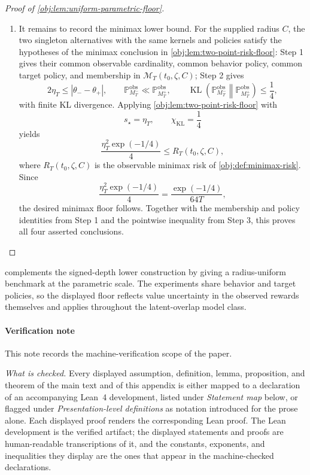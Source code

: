\documentclass[11pt]{article}
\begin{document}
\begin{proof}[Proof of \cref{obj:lem:uniform-parametric-floor}]
\begin{enumerate}
\item It remains to record the minimax lower bound.  For the supplied radius \(C\),
the two singleton alternatives with the same kernels and policies satisfy the
hypotheses of the minimax conclusion in \cref{obj:lem:two-point-risk-floor}:
Step 1 gives their common observable cardinality, common behavior policy,
common target policy, and membership in \(\mathcal M_T(t_0,\zeta,C)\); Step 2
gives
\[
2\eta_T
\le
|\theta_- - \theta_+|,
\qquad
\mathbb P_{M_T^-}^{\mathrm{obs}}\ll
\mathbb P_{M_T^+}^{\mathrm{obs}},
\qquad
\operatorname{KL}\!\left(
\mathbb P_{M_T^-}^{\mathrm{obs}}
\middle\|
\mathbb P_{M_T^+}^{\mathrm{obs}}
\right)
\le
\frac14,
\]
with finite KL divergence.  Applying \cref{obj:lem:two-point-risk-floor} with
\[
s_\star=\eta_T,
\qquad
\chi_{\mathrm{KL}}=\frac14
\]
yields
\[
\frac{\eta_T^2\exp(-1/4)}{4}
\le
R_T(t_0,\zeta,C),
\]
where \(R_T(t_0,\zeta,C)\) is the observable minimax risk of
\cref{obj:def:minimax-risk}.  Since
\[
\frac{\eta_T^2\exp(-1/4)}{4}
=
\frac{\exp(-1/4)}{64T},
\]
the desired minimax floor follows.  Together with the membership and policy
identities from Step 1 and the pointwise inequality from Step 3, this proves
all four asserted conclusions.
\end{enumerate}
\end{proof}

 complements the signed-depth lower construction by giving a radius-uniform benchmark at the parametric scale. The experiments share behavior and target policies, so the displayed floor reflects value uncertainty in the observed rewards themselves and applies throughout the latent-overlap model class.

\paragraph{Verification note}
This note records the machine-verification scope of the paper.

\emph{What is checked.} Every displayed assumption, definition, lemma, proposition, and theorem of the main text and of this appendix is either mapped to a declaration of an accompanying Lean~4 development, listed under \emph{Statement map} below, or flagged under \emph{Presentation-level definitions} as notation introduced for the prose alone. Each displayed proof renders the corresponding Lean proof. The Lean development is the verified artifact; the displayed statements and proofs are human-readable transcriptions of it, and the constants, exponents, and inequalities they display are the ones that appear in the machine-checked declarations.
\end{document}
